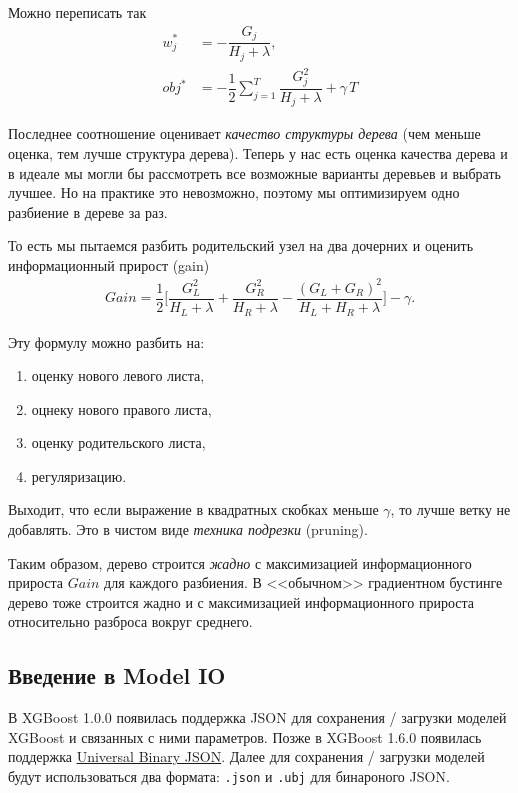\documentclass[%
	11pt,
	a4paper,
	utf8,
		]{article}
\begin{document}
Можно переписать так
\begin{align*}
	w_j^* &= - \dfrac{ G_j }{ H_j + \lambda }, \\
	obj^* &= - \dfrac{1}{2} \sum_{j=1}^T \dfrac{ G_j^2 }{ H_j + \lambda } + \gamma \, T
\end{align*}

Последнее соотношение оценивает \emph{качество структуры дерева} (чем меньше оценка, тем лучше структура дерева). Теперь у нас есть оценка качества дерева и в идеале мы могли бы рассмотреть все возможные варианты деревьев и выбрать лучшее. Но на практике это невозможно, поэтому мы оптимизируем одно разбиение в дереве за раз. 

То есть мы пытаемся разбить родительский узел на два дочерних и оценить информационный прирост (gain)
\begin{align*}
	Gain = \dfrac{1}{2} \Big[ \dfrac{G_L^2}{ H_L + \lambda } + \dfrac{G_R^2}{H_R + \lambda} - \dfrac{ (G_L + G_R)^2 }{ H_L +H_R +\lambda } \Big] - \gamma.
\end{align*}

Эту формулу можно разбить на:
\begin{enumerate}
	\item оценку нового левого листа,
	
	\item оцнеку нового правого листа,
	
	\item оценку родительского листа,
	
	\item регуляризацию.
\end{enumerate}

Выходит, что если выражение в квадратных скобках меньше $ \gamma $, то лучше ветку не добавлять. Это в чистом виде \emph{техника подрезки} (pruning).

Таким образом, дерево строится \emph{жадно} с максимизацией информационного прироста $ Gain $ для каждого разбиения. В <<обычном>> градиентном бустинге дерево тоже строится жадно и с максимизацией информационного прироста относительно разброса вокруг среднего.

\subsection{Введение в Model IO}

В XGBoost 1.0.0 появилась поддержка JSON для сохранения / загрузки моделей XGBoost и связанных с ними параметров. Позже в XGBoost 1.6.0 появилась поддержка \href{https://ubjson.org/}{Universal Binary JSON}. Далее для сохранения / загрузки моделей будут использоваться два формата: \verb|.json| и \verb|.ubj| для бинароного JSON.
\end{document}
